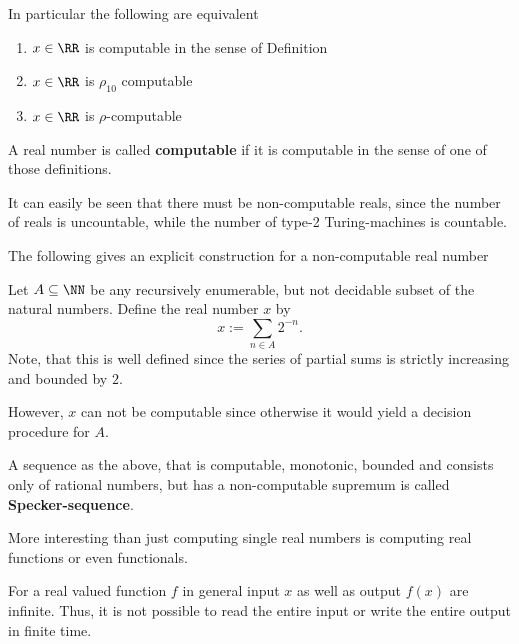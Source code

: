 In particular the following are equivalent
\begin{theorem}
\begin{enumerate}
  \item $x \in \RR$ is computable in the sense of Definition 
  \item $x \in \RR$ is $\rho_{10}$ computable
  \item $x \in \RR$ is $\rho$-computable
\end{enumerate}
\end{theorem}
A real number is called \textbf{computable} if it is computable in the sense of one of
those definitions.

It can easily be seen that there must be non-computable reals, since the number
of reals is uncountable, while the number of type-2 Turing-machines is
countable.

The following gives an explicit construction for a non-computable real number
\begin{example}
Let $A \subseteq \NN$ be any recursively enumerable, but not decidable subset
of the natural numbers.
Define the real number $x$ by
$$ x := \sum_{n \in A} 2^{-n}. $$
Note, that this is well defined since the series of partial sums is strictly
increasing and bounded by $2$.

However, $x$ can not be computable since otherwise it would yield a decision
procedure for $A$. 
\end{example}
A sequence as the above, that is computable, monotonic, bounded and consists
only of rational numbers, but has a non-computable supremum is called \textbf{Specker-sequence}.

More interesting than just computing single real numbers is computing real
functions or even functionals.

For a real valued function $f$ in general input $x$ as well as
output $f(x)$ are infinite. 
Thus, it is not possible to read the entire input or write the entire output in
finite time.

